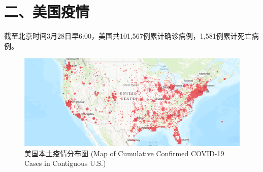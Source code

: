 \documentclass[]{article}
\begin{document}
\hypertarget{section-3}{%
\section{\texorpdfstring{\textcolor{glaucous}{二、美国疫情}}{}}\label{section-3}}

截至北京时间3月28日早6:00，美国共101,567例累计确诊病例，1,581例累计死亡病例。

\begin{figure}[H] 
\centering
\includegraphics[]{./input/table_plot/covid5.png} %
\caption{美国本土疫情分布图 (Map of Cumulative Confirmed COVID-19 Cases in Contiguous U.S.)} %
\label{} %
\end{figure}
\end{document}
